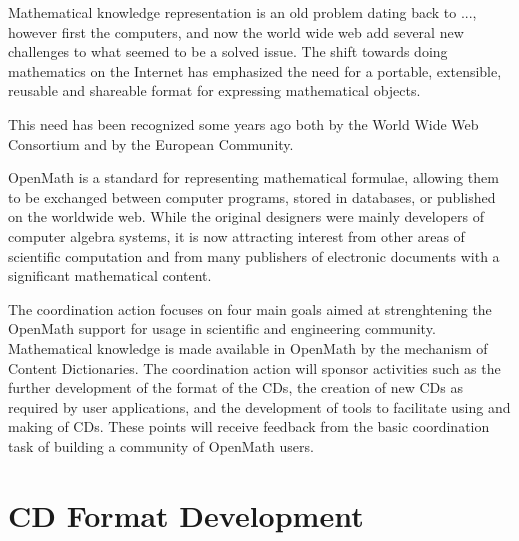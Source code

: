 \documentclass{euproposal}
\begin{document}
Mathematical knowledge representation is an old problem dating back to
..., however first the computers, and now the world wide web add
several new challenges to what seemed to be a solved issue.
The shift towards doing mathematics on the Internet has emphasized the
need for a portable, extensible, reusable and shareable format for
expressing mathematical objects.

This need has been recognized some years ago both by the World Wide
Web Consortium and by the European Community. 

OpenMath is a standard for representing mathematical formulae,
allowing them to be exchanged between computer programs, stored in
databases, or published on the worldwide web.  While the original
designers were mainly developers of computer algebra systems, it is
now attracting interest from other areas of scientific computation and
from many publishers of electronic documents with a significant
mathematical content. 









The coordination action focuses on four main goals aimed at
strenghtening the OpenMath support for usage in scientific and
engineering community. Mathematical knowledge is made available in
OpenMath by the mechanism of Content Dictionaries. The coordination
action will sponsor activities such as the further development of the
format of the CDs, the creation of new CDs as required by user
applications, and the development of tools to facilitate using and
making of CDs. These points will receive feedback from the basic
coordination task of building a community of OpenMath users.

\section{CD Format Development}
\label{format}
\end{document}
